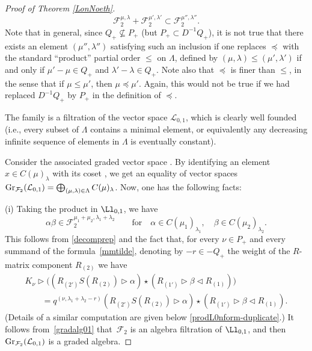 \begin{proof}[Proof of Theorem \ref{LonNoeth}]
\[{\mathcal F}_2^{\mu,\lambda}+ {\mathcal F}_2^{\mu',\lambda'} \subset {\mathcal F}_2^{\mu'',\lambda''}.\]
Note that in general, since $Q_+\nsubseteq P_+$ (but $P_+\subset D^{-1}Q_+$), it is not true that there exists an element $(\mu'',\lambda'')$ satisfying such an inclusion if one replaces $\preceq$ with the standard ``product'' partial order $\leq$ on $\Lambda$, defined by $(\mu,\lambda)\leq (\mu', \lambda')$ if and only if $\mu'-\mu\in Q_+$ and $\lambda'-\lambda\in Q_+$. Note also that $\preceq$ is finer than $\leq$, in the sense that if $\mu \leq \mu'$, then $\mu\preceq \mu'$. Again, this would not be true if we had replaced $D^{-1}Q_+$ by $P_+$ in the definition of $\preceq$.

The family  is a filtration of the vector space $ {\mathcal L}_{0,1}$, which is clearly well founded (i.e., every subset of $\Lambda$ contains a minimal element, or equivalently any decreasing infinite sequence of elements in $\Lambda$ is eventually constant).

Consider the associated graded vector space . By identifying an element $x\in C(\mu)_\lambda$ with its coset , we get an equality of vector spaces $ {\rm Gr}_{{\mathcal F}_2}({\mathcal L}_{0,1})= \bigoplus_{(\mu,\lambda)\in \Lambda} C(\mu)_\lambda$. Now, one has the following facts:

(i) Taking the product in $\Ll_{0,1}$, we have
\begin{equation}\label{gradalg01}
\alpha \beta\in {\mathcal F}_2^{\mu_1+\mu_2,\lambda_1+\lambda_2}\qquad \mathrm{for}\quad \alpha \in C(\mu_1)_{\lambda_1},\quad \beta \in C(\mu_2)_{\lambda_2}.
\end{equation}
This follows from \eqref{decomprep} and the fact that, for every $\nu\in P_+$ and every summand of the formula~\eqref{mmtilde}, denoting by $-r\in -Q_+$ the weight of the $R$-matrix component $R_{(2)}$ we have
\begin{gather*}%
K_\nu\rhd \bigl((R_{(2')}{S}(R_{(2)}) \rhd \alpha) \star (R_{(1')}\rhd \beta \lhd R_{(1)})\bigr) \\
\qquad= q^{(\nu,\lambda_1+\lambda_2-r)}(R_{(2')}{S}(R_{(2)}) \rhd \alpha) \star (R_{(1')}\rhd \beta \lhd R_{(1)}).
\end{gather*}
(Details of a similar computation are given below \eqref{prodL0nform-duplicate}.) It follows from~\eqref{gradalg01} that~$\mathcal{F}_2$ is an algebra filtration of $\Ll_{0,1}$, and then ${\rm Gr}_{\mathcal F_2}({\mathcal L}_{0,1})$ is a graded algebra.


\end{proof}
